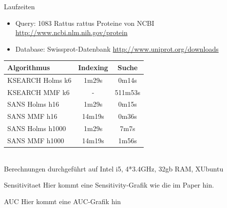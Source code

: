 \documentclass[xcolor=dvipsnames, aspectratio=1610]{beamer}
\begin{document}
\begin{frame}{Laufzeiten}
  \begin{itemize}
    \item Query: 1083 Rattus rattus Proteine von NCBI \tiny{\url{http://www.ncbi.nlm.nih.gov/protein}}
    \item \normalsize{Database: Swissprot-Datenbank} \tiny{\url{http://www.uniprot.org/downloads}}
  \end{itemize}
  \begin{tabular}{l|cc}
    Algorithmus & Indexing & Suche \\
    \hline
    KSEARCH Holms k6 & 1m29s & 0m14s \\
    KSEARCH MMF k6 & -  & 511m53s \\
     SANS Holms h16 & 1m29s &  0m15s \\
       SANS MMF  h16 & 14m19s & 0m36s \\
     SANS Holms h1000 & 1m29s & 7m7s \\
       SANS MMF  h1000 & 14m19s & 1m56s \\
  \end{tabular}\\
  \tiny{Berechnungen durchgeführt auf Intel i5, 4*3.4GHz, 32gb RAM, XUbuntu}
\end{frame}

\begin{frame}{Sensitivitaet}
  Hier kommt eine Sensitivity-Grafik wie die im Paper hin.
\end{frame}

\begin{frame}{AUC}
  Hier kommt eine AUC-Grafik hin
\end{frame}
\end{document}
